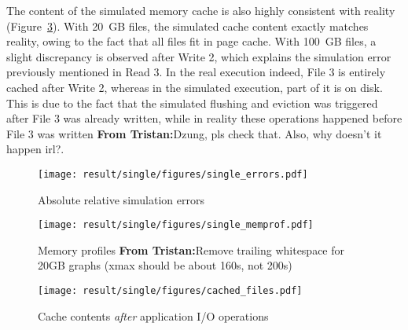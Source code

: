 \documentclass[conference]{IEEEtran}
\newcommand{\tristan}[1]{\color{orange}\textbf{From Tristan:}#1\color{black}}
\begin{document}
        The content of the simulated memory cache is also highly consistent
        with reality (Figure~\ref{fig:single_cache}). With 20~GB files, the
        simulated cache content exactly matches reality, owing to the fact
        that all files fit in page cache. With 100~GB files, a slight
        discrepancy is observed after Write 2, which explains the
        simulation error previously mentioned in Read 3. In the real execution indeed, 
        File 3 is entirely cached after Write 2, whereas in the simulated execution, part 
        of it is on disk. This is due to the fact that the simulated flushing and eviction 
        was triggered after File 3 was already written, while in reality these operations 
        happened before File 3 was written \tristan{Dzung, pls check that. Also, why doesn't it happen irl?}.


            \begin{figure*}
            \centering
            \begin{subfigure}{\linewidth}
                \centering
                   \texttt{[image: result/single/figures/single\_errors.pdf]}
                   \vspace*{-0.7cm}
                   \caption{Absolute relative simulation errors}
                   \vspace*{0.5cm}
                   \label{fig:single_error}
                \end{subfigure}
            \begin{subfigure}{\linewidth}
                \centering
                   \texttt{[image: result/single/figures/single\_memprof.pdf]}
                   \vspace*{-0.7cm}
                   \caption{Memory profiles \tristan{Remove trailing whitespace for 20GB graphs (xmax should be about 160s, not 200s)}}
                   \vspace*{0.5cm}
                   \label{fig:single_memprof}
            \end{subfigure}
            \begin{subfigure}{\linewidth}
                \centering
                   \texttt{[image: result/single/figures/cached\_files.pdf]}
                   \caption{Cache contents \emph{after} application I/O operations}
                   \label{fig:single_cache}
            \end{subfigure}
            \caption{Single-threaded results}
            \end{figure*}
\end{document}
